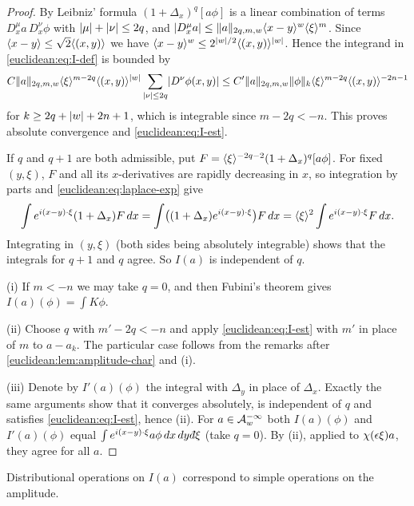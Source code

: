 \begin{proof}
  By Leibniz' formula $(1+\Delta_x)^q[a\phi]$ is a linear combination of
  terms $D^\mu_xa\,D^\nu_x\phi$ with $\lvert \mu\rvert+\lvert \nu\rvert\le2q$, and
  $\lvert D^\mu_xa\rvert\le\lVert a\rVert_{2q,m,w}\langle x-y\rangle^w\langle \xi\rangle^m$. Since
  $\langle x-y\rangle\le\sqrt2\langle (x,y)\rangle$ we have
  $\langle x-y\rangle^w\le2^{\lvert w\rvert/2}\langle (x,y)\rangle^{\lvert w\rvert}$. Hence the integrand in
  \eqref{euclidean:eq:I-def} is bounded by
  \begin{equation*}
    C\lVert a\rVert_{2q,m,w}\langle \xi\rangle^{m-2q}\langle (x,y)\rangle^{\lvert w\rvert}
    \sum_{\lvert \nu\rvert\le2q}\lvert D^\nu\phi(x,y)\rvert
    \le C'\lVert a\rVert_{2q,m,w}\lVert \phi\rVert_k\langle \xi\rangle^{m-2q}\langle (x,y)\rangle^{-2n-1}
  \end{equation*}
  for $k\ge2q+\lvert w\rvert+2n+1$, which is integrable since $m-2q<-n$. This proves
  absolute convergence and \eqref{euclidean:eq:I-est}.

  If $q$ and $q+1$ are both admissible, put
  $F=\langle \xi\rangle^{-2q-2}(1+\Delta_x)^q[a\phi]$. For fixed $(y,\xi)$, $F$ and all
  its $x$-derivatives are rapidly decreasing in $x$, so integration by
  parts and \eqref{euclidean:eq:laplace-exp} give
  \begin{equation*}
    \int e^{i(x-y)\cdot\xi}(1+\Delta_x)F\,dx=\int\bigl((1+\Delta_x)e^{i(x-y)\cdot\xi}\bigr)F\,dx
    =\langle \xi\rangle^2\int e^{i(x-y)\cdot\xi}F\,dx.
  \end{equation*}
  Integrating in $(y,\xi)$ (both sides being absolutely integrable) shows that
  the integrals for $q+1$ and $q$ agree. So $I(a)$ is independent of $q$.

  (i) If $m<-n$ we may take $q=0$, and then Fubini's theorem gives
  $I(a)(\phi)=\int K\phi$.

  (ii) Choose $q$ with $m'-2q<-n$ and apply \eqref{euclidean:eq:I-est} with
  $m'$ in place of $m$ to $a-a_k$. The particular case follows from the
  remarks after \cref{euclidean:lem:amplitude-char} and (i).

  (iii) Denote by $I'(a)(\phi)$ the integral with $\Delta_y$ in place of
  $\Delta_x$. Exactly the same arguments show that it converges absolutely,
  is independent of $q$ and satisfies \eqref{euclidean:eq:I-est}, hence (ii).
  For $a\in\mathcal{A}^{-\infty}_{w}$ both $I(a)(\phi)$ and $I'(a)(\phi)$ equal
  $\int e^{i(x-y)\cdot\xi}a\phi\,dx\,dy\,\dbar\xi$ (take $q=0$). By (ii), applied
  to $\chi(\epsilon\xi)a$, they agree for all $a$.
\end{proof}

Distributional operations on $I(a)$ correspond to simple operations on the
amplitude.

